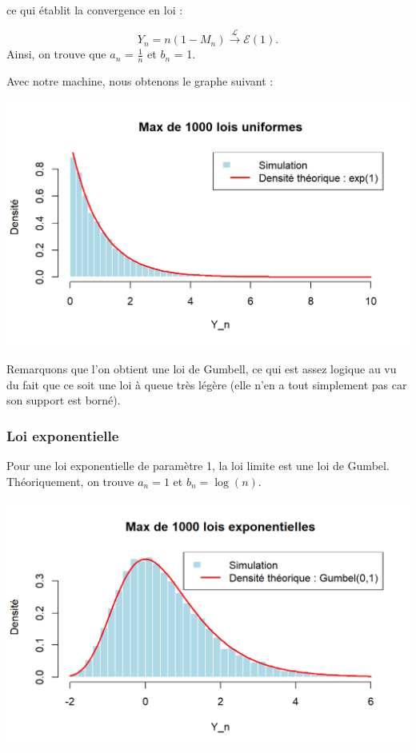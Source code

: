 \documentclass{article}
\theoremstyle{plain}
\theoremstyle{definition}
\theoremstyle{plain}
\begin{document}
\noindent ce qui établit la convergence en loi :

\[
Y_n = n(1 - M_n) \xrightarrow{\mathcal{L}} \mathcal{E}(1).
\] 
\noindent Ainsi, on trouve que $a_n$ = $\frac{1}{n}$ et $b_n$ = 1.

\noindent Avec notre machine, nous obtenons le graphe suivant :

\begin{center}
	\includegraphics[scale=0.8]{./images/Max_Uniforme.png} 
\end{center}

\noindent Remarquons que l'on obtient une loi de Gumbell, ce qui est assez logique au vu du fait que ce soit une loi à queue très légère (elle n'en a tout simplement pas car son support est borné).

\subsubsection{Loi exponentielle}
\noindent Pour une loi exponentielle de paramètre 1, la loi limite est une loi de Gumbel. Théoriquement, on trouve $a_n = 1 $ et $b_n = \log(n) $.

\begin{center}
	\includegraphics[scale=0.8]{./images/Max_Expo.png} 
\end{center}
\end{document}

